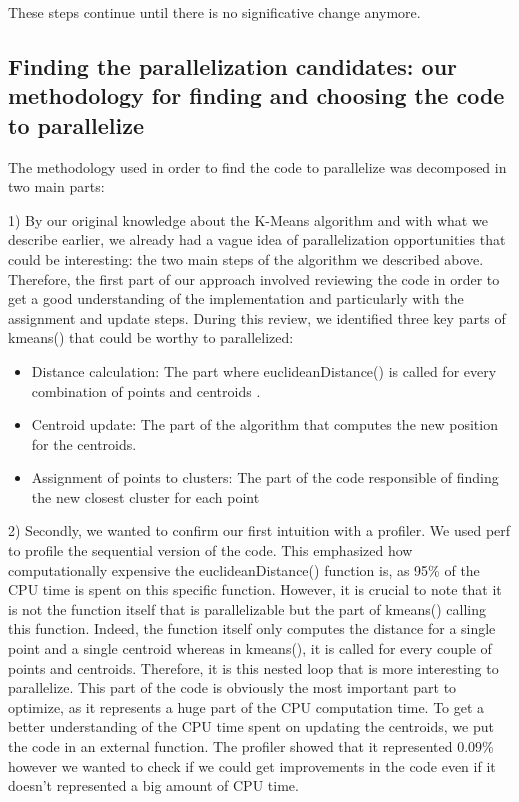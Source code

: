 \documentclass[sigconf]{acmart}
\begin{document}
These steps continue until there is no significative change anymore.

\subsection{Finding the parallelization candidates: our methodology for finding and choosing the code to parallelize}

The methodology used in order to find the code to parallelize was decomposed in two main parts:

1) By our original knowledge about the K-Means algorithm and with what we describe earlier, we already had a vague idea of parallelization opportunities that could be interesting: the two main steps of the algorithm we described above. Therefore, the first part of our approach involved reviewing the code in order to get a good understanding of the implementation and particularly with the assignment and update steps.
During this review, we identified three key parts of kmeans() that could be worthy to parallelized:
\begin{itemize}
  \item Distance calculation: The part where euclideanDistance() is called for
every combination of points and centroids .
\item Centroid update: The part of the algorithm that computes the new position for the centroids.
\item Assignment of points to clusters: The part of the code responsible of finding the new closest cluster for each point
\end{itemize}

2) Secondly, we wanted to confirm our first intuition with a profiler. We used perf to profile the sequential version of the code. This emphasized how computationally expensive the euclideanDistance() function is, as 95\% of the CPU time is spent on this specific function.
However, it is crucial to note that it is not the function itself that is parallelizable but the part of kmeans() calling this function. Indeed, the function itself only computes the distance for a single point and a single centroid whereas in kmeans(), it is called for every couple of points and centroids. Therefore, it is this nested loop that is more interesting to parallelize. This part of the code is obviously the most important part to optimize, as it represents a huge part of the CPU computation time.
To get a better understanding of the CPU time spent on updating the centroids, we put the code in an external function. The profiler showed that it represented 0.09\% however we wanted to check if we could get improvements in the code even if it  doesn't represented a big amount of CPU time.
\end{document}
